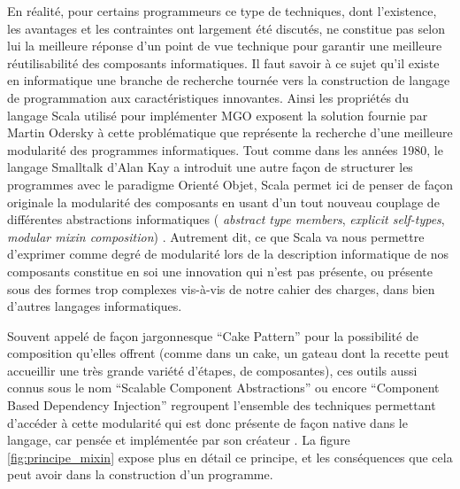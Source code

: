 En réalité, pour certains programmeurs \textcite{Odersky2005}  ce type de techniques, dont l'existence, les avantages et les contraintes ont largement été discutés, ne constitue pas selon lui la meilleure réponse d'un point de vue technique pour garantir une meilleure réutilisabilité des composants informatiques. Il faut savoir à ce sujet qu'il existe en informatique une branche de recherche tournée vers la construction de langage de programmation aux caractéristiques innovantes. Ainsi les propriétés du langage Scala utilisé pour implémenter MGO exposent la solution fournie par Martin Odersky à cette problématique que représente la recherche d'une meilleure modularité des programmes informatiques. Tout comme dans les années 1980, le langage Smalltalk d'Alan Kay a introduit une autre façon de structurer les programmes avec le paradigme Orienté Objet, Scala permet ici de penser de façon originale la modularité des composants en usant d'un tout nouveau couplage de différentes abstractions informatiques ( \textit{abstract type members}, \textit{explicit self-types}, \textit{modular mixin composition}) . Autrement dit, ce que Scala va nous permettre d'exprimer comme degré de modularité lors de la description informatique de nos composants constitue en soi une innovation qui n'est pas présente, ou présente sous des formes trop complexes vis-à-vis de notre cahier des charges, dans bien d'autres langages informatiques.




Souvent appelé de façon jargonnesque \foreignquote{english}{Cake Pattern} pour la possibilité de composition qu'elles offrent (comme dans un cake, un gateau dont la recette peut accueillir une très grande variété d'étapes, de composantes), ces outils aussi connus sous le nom \foreignquote{english}{Scalable Component Abstractions} ou encore \foreignquote{english}{Component Based Dependency Injection} regroupent  l'ensemble des techniques permettant d'accéder à cette modularité qui est donc présente de façon native dans le langage, car pensée et implémentée par son créateur \autocite{Odersky2005}. La figure \ref{fig:principe_mixin} expose plus en détail ce principe, et les conséquences que cela peut avoir dans la construction d'un programme.


